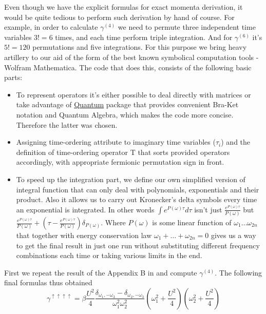 Even though we have the explicit formulas for exact momenta derivation, it would be quite tedious to perform such derivation by hand of course.
For example, in order to calculate $\gamma^{(4)}$ we need to permute three independent time variables  $3!=6$ times, and each time perform triple integration.
And for $\gamma^{(6)}$ it's $5!=120$ permutations and five integrations.
For this purpose we bring heavy artillery to our aid of the form of the best known symbolical computation tools - Wolfram Mathematica.
The code that does this, consists of the following basic parts:
\begin{itemize}
 \item To represent operators it's either possible to deal directly with matrices or take advantage of \href{http://homepage.cem.itesm.mx/lgomez/quantum/}{Quantum}
package that provides convenient Bra-Ket notation and Quantum Algebra, which makes the code more concise. Therefore the latter was chosen.
 \item Assigning time-ordering attribute to imaginary time variables ($\tau_i$) and the definition of time-ordering operator T that sorts provided operators accordingly,
with appropriate fermionic permutation sign in front.
 \item To speed up the integration part, we define our own simplified version of integral function that can only deal with polynomials, exponentials and their product.
Also it allows us to carry out Kronecker's delta symbols every time an exponential is integrated.
In other words $\int e^{P(\omega)\tau}d\tau$ isn't just $\frac{e^{P(\omega)\tau}}{P(\omega)}$
 but $\frac{e^{P(\omega)\tau}}{P(\omega)}+(\tau-\frac{e^{P(\omega)\tau}}{P(\omega)})\delta_{P(\omega)}$.
Where $P(\omega)$ is some linear function of $\omega_1\dots\omega_{2n}$ that together with energy conservation law $\omega_1+\dots+\omega_{2n}=0$ 
 gives us a way to get the final result in just one run without substituting different frequency combinations each time or taking various limits in the end.
\end{itemize}

First we repeat the result of the Appendix B in \cite{0809.1051} and compute $\gamma^{(4)}$. The following final formulas thus obtained
\begin{equation} \gamma^{\uparrow\uparrow\uparrow\uparrow} = \beta \frac{U^2}{4}\frac{\delta_{\omega_1,-\omega_3}-\delta_{\omega_2,-\omega_3}}{\omega_1^2\omega_2^2}
  (\omega_1^2+\frac{U^2}{4})(\omega_2^2+\frac{U^2}{4}) 
\end{equation}

